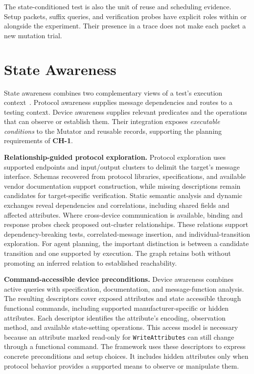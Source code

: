 \documentclass[10pt,journal,compsoc]{IEEEtran}
\newcommand{\parab}[1]{\vspace{0.04in}\noindent\textbf{#1}}
\begin{document}
The state-conditioned test is also the unit of reuse and scheduling evidence. Setup packets, suffix queries, and verification probes have explicit roles within or alongside the experiment. Their presence in a trace does not make each packet a new mutation trial.

\section{State Awareness}\label{sec:state-awareness}
State awareness combines two complementary views of a test's execution context~\cite{zvdetector}. Protocol awareness supplies message dependencies and routes to a testing context. Device awareness supplies relevant predicates and the operations that can observe or establish them. Their integration exposes \emph{executable conditions} to the Mutator and reusable records, supporting the planning requirements of \textbf{CH-1}.

\parab{Relationship-guided protocol exploration.}
Protocol exploration uses supported endpoints and input/output clusters to delimit the target's message interface. Schemas recovered from protocol libraries, specifications, and available vendor documentation support construction, while missing descriptions remain candidates for target-specific verification. Static semantic analysis and dynamic exchanges reveal dependencies and correlations, including shared fields and affected attributes. Where cross-device communication is available, binding and response probes check proposed out-cluster relationships. These relations support dependency-breaking tests, correlated-message insertion, and individual-transition exploration. For agent planning, the important distinction is between a candidate transition and one supported by execution. The graph retains both without promoting an inferred relation to established reachability.

\parab{Command-accessible device preconditions.}
Device awareness combines active queries with specification, documentation, and message-function analysis. The resulting descriptors cover exposed attributes and state accessible through functional commands, including supported manufacturer-specific or hidden attributes. Each descriptor identifies the attribute's encoding, observation method, and available state-setting operations. This access model is necessary because an attribute marked read-only for \texttt{WriteAttributes} can still change through a functional command. The framework uses these descriptors to express concrete preconditions and setup choices. It includes hidden attributes only when protocol behavior provides a supported means to observe or manipulate them.
\end{document}
